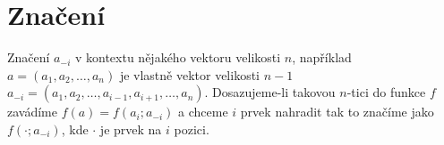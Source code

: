 \section{Značení}
Značení $a_{-i}$ v kontextu nějakého vektoru velikosti $n$, například $a = (a_1, a_2, \dots, a_n)$ je vlastně vektor velikosti $n-1$ $a_{-i} = (a_1, a_2, \dots, a_{i-1}, a_{i+1}, \dots, a_n)$.
Dosazujeme-li takovou $n$-tici do funkce $f$ zavádíme $f(a) = f(a_i; a_{-i})$ a chceme $i$ prvek nahradit tak to značíme jako $f( \cdot ; a_{-i})$, kde $\cdot$ je prvek na $i$ pozici.
